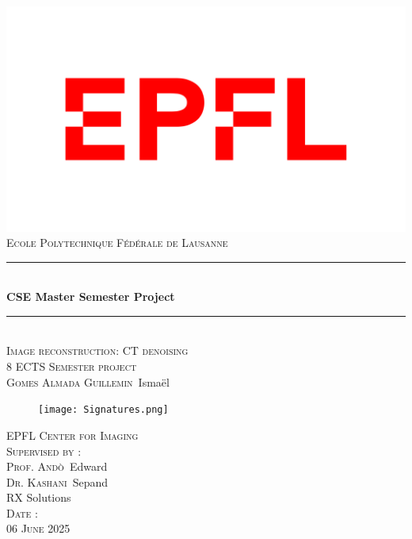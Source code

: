 \documentclass{article}
\begin{document}
\begin{titlepage}
\newcommand{\HRule}{\rule{\linewidth}{0.5mm}} %
\center %
\includegraphics[width=0.7\linewidth]{epfl.png}\\[1cm] %
\textsc{\LARGE Ecole Polytechnique Fédérale de Lausanne}\\[2cm]
\HRule \\[0.4cm]
{ \huge \bfseries CSE Master Semester Project}\\[0.4cm] %
\HRule \\[1.5cm]
\textsc{\LARGE Image reconstruction: CT denoising}\\[1cm]

\textsc{ 8 ECTS Semester project}\\[1cm]


\textsc{Gomes Almada Guillemin}\ Ismaël \\
\begin{figure}[H]
    \centering
    \texttt{[image: Signatures.png]}
    \label{fig:my_label}
\end{figure}

\textsc{ EPFL Center for Imaging}\\[1cm]
\textsc{Supervised by :}\\[0.2cm]
\textsc{Prof. Andò}\ Edward  \\ [0.1cm]
\textsc{Dr. Kashani}\ Sepand\\[0.1cm]
RX Solutions\ \\[1.2cm]


\textsc{\large Date :}\\[0.1cm]
\textsc{06 June 2025}\\

\end{titlepage}
\tableofcontents
\renewcommand{\contentsname}{Summary}
\thispagestyle{empty}
\newpage
\setcounter{page}{1}
\end{document}
